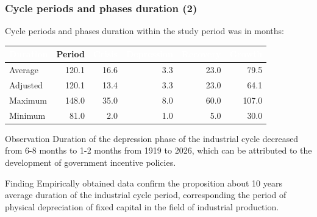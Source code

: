 \begin{frame}
  \frametitle{Cycle periods and phases duration (2)}
  Cycle periods and phases duration within the study period was in months:

  \vspace{10pt}

  \begin{tabularx}{\textwidth}{|>{\raggedright\arraybackslash\hyphenpenalty=10000\exhyphenpenalty=10000}X|r|r|r|r|r|}
    \hline
    \cellcolor{rgb,255:red,15;green,35;blue,84}\textcolor{white}{Duration} & Period & \cellcolor{rgb,255:red,128;green,0;blue,0}\textcolor{white}{Crisis} & \cellcolor{rgb,255:red,61;green,23;blue,199}\textcolor{white}{Depression} & \cellcolor{rgb,255:red,51;green,153;blue,153}\textcolor{white}{Recovery} & \cellcolor{rgb,255:red,220;green,173;blue,118}\textcolor{white}{Growth} \\ \hline
    Average & 120.1 & 16.6 & 3.3 & 23.0 & 79.5 \\ \hline
    Adjusted & 120.1 & 13.4 & 3.3 & 23.0 & 64.1 \\ \hline
    Maximum & 148.0 & 35.0 & 8.0 & 60.0 & 107.0 \\ \hline
    Minimum & 81.0 & 2.0 & 1.0 & 5.0 & 30.0 \\ \hline
  \end{tabularx}

  \begin{block}{Observation}
    Duration of the depression phase of the industrial cycle decreased from 6-8 months to 1-2 months from 1919 to 2026, which can be attributed to the development of government incentive policies.
  \end{block}

  \begin{alertblock}{Finding}
    Empirically obtained data confirm the proposition about 10 years average duration of the industrial cycle period, corresponding the period of physical depreciation of fixed capital in the field of industrial production.
  \end{alertblock}
\end{frame}

